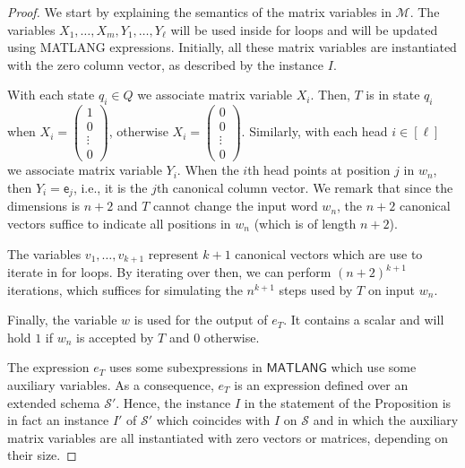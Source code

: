 \begin{proof}
We start by explaining the semantics of the matrix variables in $\mathcal{M}$. The variables $X_1,\ldots,X_m,Y_1,\allowbreak\ldots,Y_\ell$ will be used inside for loops and will be updated using \textsf{MATLANG} expressions. Initially, all these matrix variables are instantiated with the zero column vector, as described by the instance $I$. 

With each state $q_i\in Q$ we associate matrix variable $X_i$.
Then, $T$ is in state $q_i$ when
 $X_i=\left(\begin{smallmatrix}1\\
0\\\vdots\\0\end{smallmatrix}\right)$, otherwise $X_i=\left(\begin{smallmatrix}0\\
0\\\vdots\\0\end{smallmatrix}\right)$.	Similarly, with each head $i\in[\ell]$ we
associate matrix variable $Y_i$. When the $i$th head points at position $j$ in $w_n$,
then $Y_i=\mathsf{e}_j$, i.e., it is the $j$th canonical column vector. We remark that since the dimensions is $n+2$ and $T$ cannot change the input word $w_n$, the $n+2$ canonical vectors suffice to indicate all positions in $w_n$ (which is of length $n+2$).

The variables $v_1,\ldots,v_{k+1}$ represent $k+1$ canonical vectors  which are use to iterate in for loops. By iterating over then, we can perform $(n+2)^{k+1}$ iterations, which suffices for simulating the $n^{k+1}$ steps used by $T$ on input $w_n$.

Finally, the variable $w$ is used for the output of $e_T$. It contains a scalar and will hold $1$ if $w_n$ is accepted by $T$ and $0$ otherwise.

The expression $e_T$ uses some subexpressions in $\mathsf{MATLANG}$ which use some auxiliary variables.
As a consequence, $e_T$ is an expression defined over an extended schema $\mathcal{S}'$. Hence, the instance $I$ in the statement of the Proposition is in fact an instance $I'$ of $\mathcal{S}'$ which
coincides with $I$ on $\mathcal{S}$ and in which the auxiliary matrix variables are all instantiated with zero vectors or matrices, depending on their size.


\end{proof}
